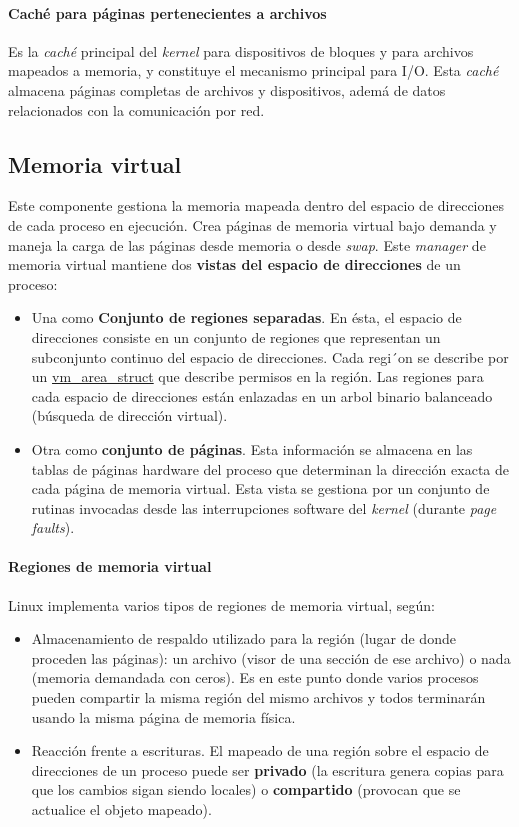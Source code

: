 \documentclass[spanish]{article}
\begin{document}
\paragraph{Caché para páginas pertenecientes a archivos}Es la \textit{caché} principal del \textit{kernel} para dispositivos de bloques y para archivos mapeados a memoria, y constituye el mecanismo principal para I/O. Esta \textit{cach\'{e}} almacena p\'{a}ginas completas de archivos y dispositivos, adem\'{a} de datos relacionados con la comunicaci\'{o}n por red.

\subsection{Memoria virtual}
Este componente gestiona la memoria mapeada dentro del espacio de direcciones de cada proceso en ejecución. Crea páginas de memoria virtual bajo demanda y maneja la carga de las páginas desde memoria o desde \textit{swap}. Este \textit{manager} de memoria virtual mantiene dos \textbf{vistas del espacio de direcciones} de un proceso: 
\begin{itemize}
	\item Una como \textbf{Conjunto de regiones separadas}. En ésta, el espacio de direcciones consiste en un conjunto de regiones que representan un subconjunto continuo del espacio de direcciones. Cada regi´on se describe por un \url{vm_area_struct} que describe permisos en la regi\'{o}n. Las regiones para cada espacio de direcciones están enlazadas en un arbol binario balanceado (búsqueda de dirección virtual).
	\item Otra como \textbf{conjunto de páginas}. Esta informaci\'{o}n se almacena en las tablas de p\'{a}ginas hardware del proceso que determinan la direcci\'{o}n exacta de cada p\'{a}gina de memoria virtual. Esta vista se gestiona por un conjunto de rutinas invocadas desde las interrupciones software del \textit{kernel} (durante \textit{page faults}). 
\end{itemize}
\paragraph{Regiones de memoria virtual} Linux implementa varios tipos de regiones de memoria virtual, según:
\begin{itemize}
	\item Almacenamiento de respaldo utilizado para la región (lugar de donde proceden las páginas): un archivo (visor de una secci\'{o}n de ese archivo) o nada (memoria demandada con ceros). Es en este punto donde varios procesos pueden compartir la misma región del mismo archivos y todos terminarán usando la misma página de memoria física.
	\item Reacción frente a escrituras. El mapeado de una región sobre el espacio de direcciones de un proceso puede ser \textbf{privado} (la escritura genera copias para que los cambios sigan siendo locales) o \textbf{compartido} (provocan que se actualice el objeto mapeado).
\end{itemize}
\end{document}
